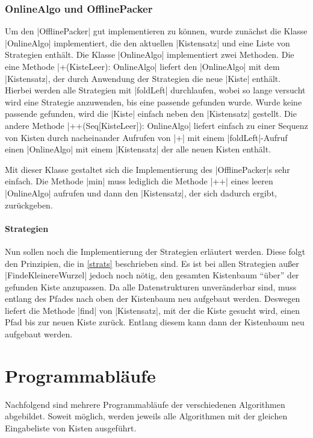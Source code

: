 \subsubsection{OnlineAlgo und OfflinePacker}
Um den |OfflinePacker| gut implementieren zu können, wurde zunächst die Klasse |OnlineAlgo| implementiert, die den aktuellen |Kistensatz| und eine Liste von Strategien enthält.
Die Klasse |OnlineAlgo| implementiert zwei Methoden.
Die eine Methode |+(KisteLeer): OnlineAlgo| liefert den |OnlineAlgo| mit dem |Kistensatz|, der durch Anwendung der Strategien die neue |Kiste| enthält.
Hierbei werden alle Strategien mit |foldLeft| durchlaufen, wobei so lange versucht wird eine Strategie anzuwenden, bis eine passende gefunden wurde.
Wurde keine passende gefunden, wird die |Kiste| einfach neben den |Kistensatz| gestellt.
Die andere Methode |++(Seq[KisteLeer]): OnlineAlgo| liefert einfach zu einer Sequenz von Kisten durch nacheinander Aufrufen von |+| mit einem |foldLeft|-Aufruf einen
|OnlineAlgo| mit einem |Kistensatz| der alle neuen Kisten enthält.

Mit dieser Klasse gestaltet sich die Implementierung des |OfflinePacker|s sehr einfach.
Die Methode |min| muss lediglich die Methode |++| eines leeren |OnlineAlgo| aufrufen und dann den |Kistensatz|, der sich dadurch ergibt, zurückgeben.
\paragraph{Strategien}
Nun sollen noch die Implementierung der Strategien erläutert werden.
Diese folgt den Prinzipien, die in \ref{strats} beschrieben sind.
Es ist bei allen Strategien außer |FindeKleinereWurzel| jedoch noch nötig, den gesamten Kistenbaum ``über'' der gefunden Kiste anzupassen.
Da alle Datenstrukturen unveränderbar sind, muss entlang des Pfades nach oben der Kistenbaum neu aufgebaut werden.
Deswegen liefert die Methode |find| von |Kistensatz|, mit der die Kiste gesucht wird, einen Pfad bis zur neuen Kiste zurück.
Entlang diesem kann dann der Kistenbaum neu aufgebaut werden.

\clearpage

\section{Programmabläufe}
Nachfolgend sind mehrere Programmabläufe der verschiedenen Algorithmen abgebildet.
Soweit möglich, werden jeweils alle Algorithmen mit der gleichen Eingabeliste von Kisten ausgeführt.
